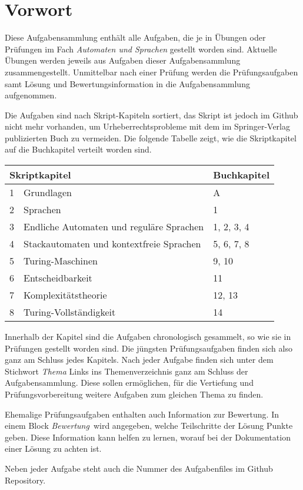 %
%
%
\chapter*{Vorwort}
Diese Aufgabensammlung enthält alle Aufgaben, die je in Übungen oder
Prüfungen im Fach {\em Automaten und Sprachen} gestellt worden sind.
Aktuelle Übungen werden jeweils aus Aufgaben dieser Aufgabensammlung
zusammengestellt.
Unmittelbar nach einer Prüfung werden die Prüfungsaufgaben samt
Lösung und Bewertungsinformation in die Aufgabensammlung aufgenommen.

Die Aufgaben sind nach Skript-Kapiteln sortiert, das Skript ist
jedoch im Github nicht mehr vorhanden, um Urheberrechtsprobleme
mit dem im Springer-Verlag publizierten Buch zu vermeiden.
Die folgende Tabelle zeigt, wie die Skriptkapitel auf die Buchkapitel
verteilt worden sind.
\begin{center}
\begin{tabular}{lll}
\hline
\multicolumn{2}{l}{Skriptkapitel}&Buchkapitel \\
\hline
1 &Grundlagen                               &  A          \\
2 &Sprachen                                 &  1          \\
3 &Endliche Automaten und reguläre Sprachen &  1, 2, 3, 4 \\
4 &Stackautomaten und kontextfreie Sprachen &  5, 6, 7, 8 \\
5 &Turing-Maschinen                         &  9, 10      \\
6 &Entscheidbarkeit                         &  11         \\
7 &Komplexitätstheorie                      &  12, 13     \\
8 &Turing-Vollständigkeit                   &  14         \\
\hline
\end{tabular}
\end{center}
Innerhalb der Kapitel sind die Aufgaben chronologisch gesammelt,
so wie sie in Prüfungen gestellt worden sind.
Die jüngsten Prüfungsaufgaben finden sich also ganz am Schluss jedes
Kapitels.
Nach jeder Aufgabe finden sich unter dem Stichwort {\em Thema} Links
ins Themenverzeichnis ganz am Schluss der Aufgabensammlung.
Diese sollen ermöglichen, für die Vertiefung und Prüfungsvorbereitung
weitere Aufgaben zum gleichen Thema zu finden.

Ehemalige Prüfungsaufgaben enthalten auch Information zur Bewertung.
In einem Block {\em Bewertung} wird angegeben, welche Teilschritte
der Lösung Punkte geben.
Diese Information kann helfen zu lernen, worauf bei der Dokumentation
einer Lösung zu achten ist.

Neben jeder Aufgabe steht auch die Nummer des Aufgabenfiles im
Github Repository.

